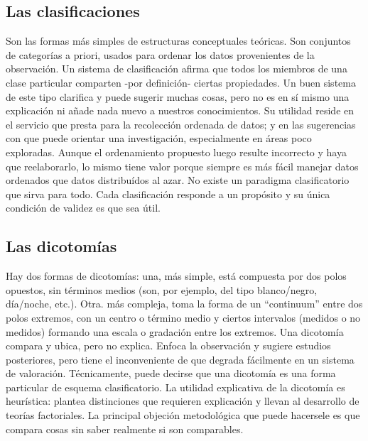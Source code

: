 \documentclass[
]{book}
\begin{document}
\hypertarget{las-clasificaciones}{%
\subsection*{Las clasificaciones}\label{las-clasificaciones}}

Son las formas más simples de estructuras conceptuales teóricas. Son conjuntos de categorías a priori, usados para ordenar los datos provenientes de la observación. Un sistema de clasificación afirma que todos los miembros de una clase particular comparten -por definición- ciertas propiedades. Un buen sistema de este tipo clarifica y puede sugerir muchas cosas, pero no es en sí mismo una explicación ni añade nada nuevo a nuestros conocimientos. Su utilidad reside en el servicio que presta para la recolección ordenada de datos; y en las sugerencias con que puede orientar una investigación, especialmente en áreas poco exploradas. Aunque el ordenamiento propuesto luego resulte incorrecto y haya que reelaborarlo, lo mismo tiene valor porque siempre es más fácil manejar datos ordenados que datos distribuídos al azar. No existe un paradigma clasificatorio que sirva para todo. Cada clasificación responde a un propósito y su única condición de validez es que sea útil.

\hypertarget{las-dicotomuxedas}{%
\subsection*{Las dicotomías}\label{las-dicotomuxedas}}

Hay dos formas de dicotomías: una, más simple, está compuesta por dos polos opuestos, sin términos medios (son, por ejemplo, del tipo blanco/negro, día/noche, etc.). Otra. más compleja, toma la forma de un ``continuum'' entre dos polos extremos, con un centro o término medio y ciertos intervalos (medidos o no medidos) formando una escala o gradación entre los extremos. Una dicotomía compara y ubica, pero no explica. Enfoca la observación y sugiere estudios posteriores, pero tiene el inconveniente de que degrada fácilmente en un sistema de valoración. Técnicamente, puede decirse que una dicotomía es una forma particular de esquema clasificatorio. La utilidad explicativa de la dicotomía es heurística: plantea distinciones que requieren explicación y llevan al desarrollo de teorías factoriales. La principal objeción metodológica que puede hacersele es que compara cosas sin saber realmente si son comparables.
\end{document}

